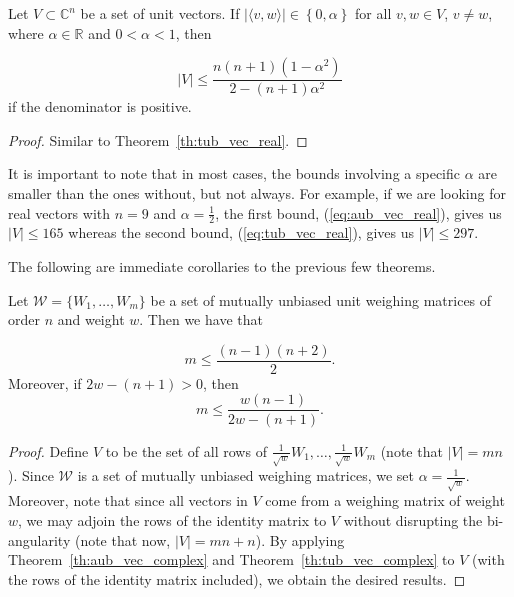 \begin{theorem}\label{th:tub_vec_complex}
  Let $V \subset \mathbb{C}^n$ be a set of unit vectors. If $|\langle v,w\rangle| \in \left\{0,\alpha\right\}$ for all $v,w\in V$, $v\neq w$, where $\alpha \in \mathbb{R}$ and $0 < \alpha < 1$, then

 \begin{equation}\label{eq:tub_vec_complex}|V|\leq \frac{n(n+1)(1-\alpha^2)}{2-(n+1)\alpha^2}\end{equation} if the denominator is positive.

 \begin{proof}
  Similar to Theorem~\ref{th:tub_vec_real}.
 \end{proof}

\end{theorem}

It is important to note that in most cases, the bounds involving a specific $\alpha$ are smaller than the ones without, but not always. For example, if we are looking for real vectors with $n=9$ and $\alpha = \frac12$, the first bound, (\ref{eq:aub_vec_real}), gives us $|V| \leq 165$ whereas the second bound, (\ref{eq:tub_vec_real}), gives us $|V| \leq 297$.

The following are immediate corollaries to the previous few theorems.

\begin{corollary} \label{cor:ub_mat_complex}
 Let $\mathcal{W}=\{W_1,\dots,W_m\}$ be a set of mutually unbiased unit weighing matrices of order $n$ and weight $w$. Then we have that

  \begin{equation}\label{eq:aub_mat_complex} m \leq \frac{(n-1)(n+2)}{2}.\end{equation}
  Moreover, if $2w-(n+1) > 0$, then
  \begin{equation}\label{eq:tub_mat_complex} m \leq \frac{w(n-1)}{2w-(n+1)}.\end{equation}
  
  \begin{proof}
    Define $V$ to be the set of all rows of $\frac{1}{\sqrt{w}}W_1, \dots, \frac{1}{\sqrt{w}}W_m$ (note that $|V| = mn$). Since $\mathcal{W}$ is a set of mutually unbiased weighing matrices, we set $\alpha=\frac{1}{\sqrt{w}}$. Moreover, note that since all vectors in $V$ come from a weighing matrix of weight $w$, we may adjoin the rows of the identity matrix to $V$ without disrupting the bi-angularity (note that now, $|V| = mn + n$). By applying Theorem~\ref{th:aub_vec_complex} and Theorem~\ref{th:tub_vec_complex} to $V$ (with the rows of the identity matrix included), we obtain the desired results.
   \end{proof}
\end{corollary}

